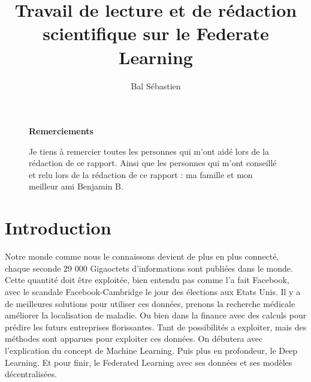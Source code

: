 \documentclass[12pt,a4paper,french]{report}
\begin{document}
\title{\Large{\Large {Travail de lecture et de rédaction scientifique sur le Federate Learning}}}

\author{Bal Sébastien}

\maketitle

\thispagestyle{empty} %

 


\begin{figure}[p]

\large\textbf{Remerciements}


Je tiens à remercier toutes les personnes qui m'ont aidé lors de la rédaction de ce rapport. Ainsi que les personnes qui m'ont conseillé et relu lors de la rédaction de ce rapport : ma famille et mon meilleur ami Benjamin B. 

\end{figure}

\tableofcontents
\thispagestyle{empty} %




\chapter{Introduction}


\fancyfoot[R]{\thepage}

Notre monde comme nous le connaissons devient de plus en plus connecté, chaque seconde 29 000 Gigaoctets d'informations sont publiées dans le monde. Cette quantité doit être exploitée, bien entendu pas comme l'a fait Facebook, avec le scandale Facebook-Cambridge le jour des élections aux Etats Unis. Il y a de meilleures solutions pour utiliser ces données, prenons la recherche médicale améliorer la localisation de maladie. Ou bien dans la finance avec des calculs pour prédire les futurs entreprises florissantes. Tant de possibilités a exploiter, mais des méthodes sont apparues pour exploiter ces données. On débutera avec l'explication du concept de Machine Learning. Puis plus en profondeur, le Deep Learning. Et pour finir, le Federated Learning avec ses données et ses modèles décentralisées.
\end{document}
